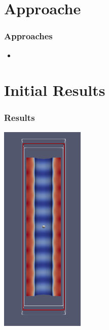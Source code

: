 \documentclass[aspectratio=169]{beamer}
\begin{document}
\section{Approache}
\begin{frame}
  \frametitle{Approaches}
  \begin{itemize}
    \item 
  \end{itemize}
\end{frame}
\section{Initial Results}
\begin{frame}
  \frametitle{Results}
  \begin{minipage}{0.55\textwidth}
    \includegraphics[width=0.30\textwidth, trim={0cm 0cm 0cm 0cm}, clip]{Taylor-couette.png}
  \end{minipage}
\end{frame}

\begin{frame}
\frametitle{}\
  \begin{minipage}{0.45\textwidth}
    \centering
    \vfill
  \end{minipage}
  \begin{minipage}{0.45\textwidth}
    \centering
    \vfill
  \end{minipage}
\end{frame}
\end{document}
